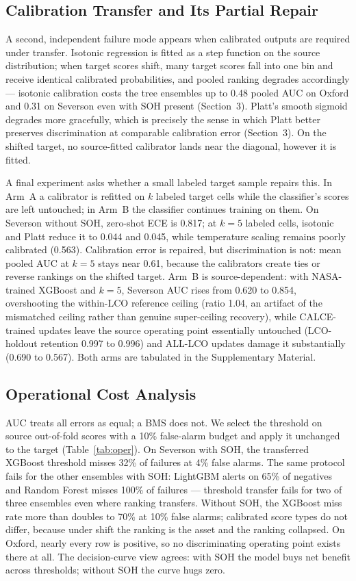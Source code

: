 \documentclass[11pt,a4paper]{article}
\begin{document}
\subsection{Calibration Transfer and Its Partial Repair}
A second, independent failure mode appears when calibrated outputs are required under transfer. Isotonic regression is fitted as a step function on the source distribution; when target scores shift, many target scores fall into one bin and receive identical calibrated probabilities, and pooled ranking degrades accordingly --- isotonic calibration costs the tree ensembles up to 0.48 pooled AUC on Oxford and 0.31 on Severson even with SOH present (Section~3). Platt's smooth sigmoid degrades more gracefully, which is precisely the sense in which Platt better preserves discrimination at comparable calibration error (Section~3). On the shifted target, no source-fitted calibrator lands near the diagonal, however it is fitted.

A final experiment asks whether a small labeled target sample repairs this. In Arm~A a calibrator is refitted on $k$ labeled target cells while the classifier's scores are left untouched; in Arm~B the classifier continues training on them. On Severson without SOH, zero-shot ECE is 0.817; at $k{=}5$ labeled cells, isotonic and Platt reduce it to 0.044 and 0.045, while temperature scaling remains poorly calibrated (0.563). Calibration error is repaired, but discrimination is not: mean pooled AUC at $k{=}5$ stays near 0.61, because the calibrators create ties or reverse rankings on the shifted target. Arm~B is source-dependent: with NASA-trained XGBoost and $k{=}5$, Severson AUC rises from 0.620 to 0.854, overshooting the within-LCO reference ceiling (ratio 1.04, an artifact of the mismatched ceiling rather than genuine super-ceiling recovery), while CALCE-trained updates leave the source operating point essentially untouched (LCO-holdout retention 0.997 to 0.996) and ALL-LCO updates damage it substantially (0.690 to 0.567). Both arms are tabulated in the Supplementary Material.

\subsection{Operational Cost Analysis}
AUC treats all errors as equal; a BMS does not. We select the threshold on source out-of-fold scores with a 10\% false-alarm budget and apply it unchanged to the target (Table~\ref{tab:oper}). On Severson with SOH, the transferred XGBoost threshold misses 32\% of failures at 4\% false alarms. The same protocol fails for the other ensembles with SOH: LightGBM alerts on 65\% of negatives and Random Forest misses 100\% of failures --- threshold transfer fails for two of three ensembles even where ranking transfers. Without SOH, the XGBoost miss rate more than doubles to 70\% at 10\% false alarms; calibrated score types do not differ, because under shift the ranking is the asset and the ranking collapsed. On Oxford, nearly every row is positive, so no discriminating operating point exists there at all. The decision-curve view agrees: with SOH the model buys net benefit across thresholds; without SOH the curve hugs zero.
\end{document}
